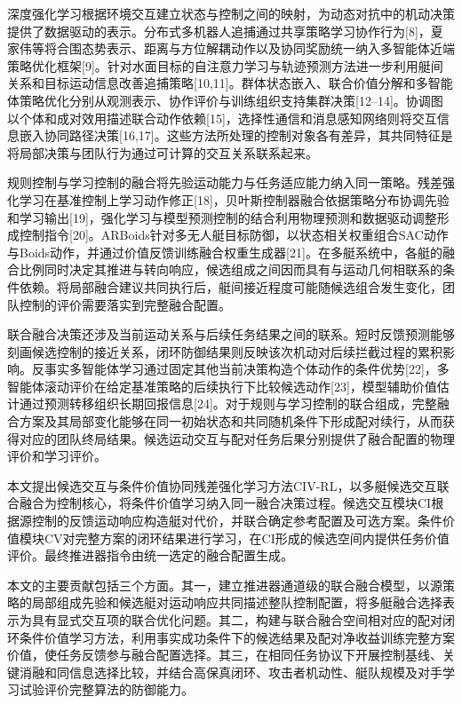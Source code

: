 \documentclass[UTF8,10.5pt,a4paper,fontset=none]{ctexart}
\begin{document}
深度强化学习根据环境交互建立状态与控制之间的映射，为动态对抗中的机动决策提供了数据驱动的表示。分布式多机器人追捕通过共享策略学习协作行为{[}8{]}，夏家伟等将合围态势表示、距离与方位解耦动作以及协同奖励统一纳入多智能体近端策略优化框架{[}9{]}。针对水面目标的自注意力学习与轨迹预测方法进一步利用艇间关系和目标运动信息改善追捕策略{[}10,11{]}。群体状态嵌入、联合价值分解和多智能体策略优化分别从观测表示、协作评价与训练组织支持集群决策{[}12--14{]}。协调图以个体和成对效用描述联合动作依赖{[}15{]}，选择性通信和消息感知网络则将交互信息嵌入协同路径决策{[}16,17{]}。这些方法所处理的控制对象各有差异，其共同特征是将局部决策与团队行为通过可计算的交互关系联系起来。

规则控制与学习控制的融合将先验运动能力与任务适应能力纳入同一策略。残差强化学习在基准控制上学习动作修正{[}18{]}，贝叶斯控制器融合依据策略分布协调先验和学习输出{[}19{]}，强化学习与模型预测控制的结合利用物理预测和数据驱动调整形成控制指令{[}20{]}。ARBoids针对多无人艇目标防御，以状态相关权重组合SAC动作与Boids动作，并通过价值反馈训练融合权重生成器{[}21{]}。在多艇系统中，各艇的融合比例同时决定其推进与转向响应，候选组成之间因而具有与运动几何相联系的条件依赖。将局部融合建议共同执行后，艇间接近程度可能随候选组合发生变化，团队控制的评价需要落实到完整融合配置。

联合融合决策还涉及当前运动关系与后续任务结果之间的联系。短时反馈预测能够刻画候选控制的接近关系，闭环防御结果则反映该次机动对后续拦截过程的累积影响。反事实多智能体学习通过固定其他当前决策构造个体动作的条件优势{[}22{]}，多智能体滚动评价在给定基准策略的后续执行下比较候选动作{[}23{]}，模型辅助价值估计通过预测转移组织长期回报信息{[}24{]}。对于规则与学习控制的联合组成，完整融合方案及其局部变化能够在同一初始状态和共同随机条件下形成配对续行，从而获得对应的团队终局结果。候选运动交互与配对任务后果分别提供了融合配置的物理评价和学习评价。

本文提出候选交互与条件价值协同残差强化学习方法CIV-RL，以多艇候选交互联合融合为控制核心，将条件价值学习纳入同一融合决策过程。候选交互模块CI根据源控制的反馈运动响应构造艇对代价，并联合确定参考配置及可选方案。条件价值模块CV对完整方案的闭环结果进行学习，在CI形成的候选空间内提供任务价值评价。最终推进器指令由统一选定的融合配置生成。

本文的主要贡献包括三个方面。其一，建立推进器通道级的联合融合模型，以源策略的局部组成先验和候选艇对运动响应共同描述整队控制配置，将多艇融合选择表示为具有显式交互项的联合优化问题。其二，构建与联合融合空间相对应的配对闭环条件价值学习方法，利用事实成功条件下的候选结果及配对净收益训练完整方案价值，使任务反馈参与融合配置选择。其三，在相同任务协议下开展控制基线、关键消融和同信息选择比较，并结合高保真闭环、攻击者机动性、艇队规模及对手学习试验评价完整算法的防御能力。
\end{document}
